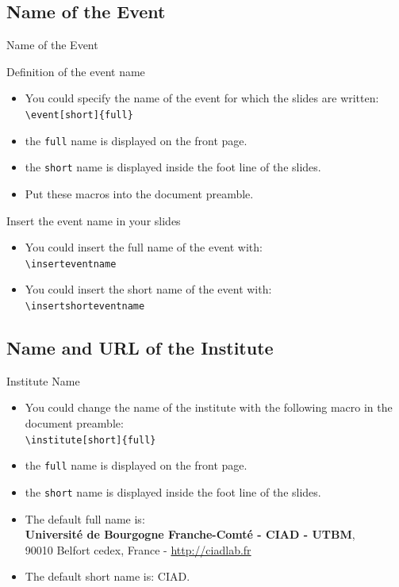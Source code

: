 \documentclass[english,sectioncirclenumberstyle]{ciadbeamer}
\begin{document}
\subsection{Name of the Event}

\begin{frame}[t]{Name of the Event}
	\begin{block}{Definition of the event name}
		\begin{itemize}
		\item You could specify the name of the event for which the slides are written: \\
			\texttt{{\textbackslash}event[short]\{full\}}
		\item the \texttt{full} name is displayed on the front page.
		\item the \texttt{short} name is displayed inside the foot line of the slides.
		\item Put these macros into the document preamble.
		\end{itemize}
	\end{block}
	\begin{block}{Insert the event name in your slides}
		\begin{itemize}
		\item You could insert the full name of the event with: \\
			\texttt{{\textbackslash}inserteventname}
		\item You could insert the short name of the event with: \\
			\texttt{{\textbackslash}insertshorteventname}
		\end{itemize}
	\end{block}
\end{frame}

\subsection{Name and URL of the Institute}
\begin{frame}{Institute Name}
	\begin{itemize}
	\item You could change the name of the institute with the following macro in the document preamble: \\
		\texttt{{\textbackslash}institute[short]\{full\}}
	\item the \texttt{full} name is displayed on the front page.
	\item the \texttt{short} name is displayed inside the foot line of the slides.
	\vspace{1em}
	\item The default full name is: \\
		\small\textbf{Universit\'e de Bourgogne Franche-Comt\'e - CIAD - UTBM}, \\
		\small90010 Belfort cedex, France - \url{http://ciadlab.fr}
	\item The default short name is: CIAD.
	\end{itemize}
\end{frame}
\end{document}

